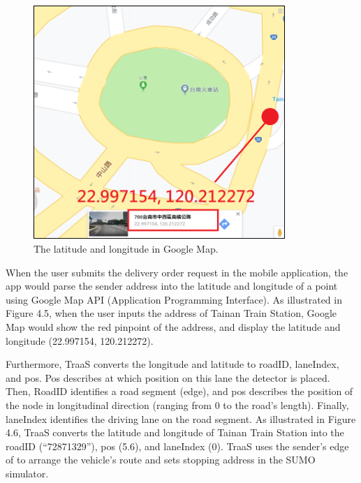 \documentclass[12pt]{ksthesis}
\begin{document}
\begin{thesis}
{\begin{figure}[H]
\centering
\includegraphics[width=0.85\textwidth]{./Thesis_figures/F4-5_GPS_googleMap.PNG}
\caption{\large The latitude and longitude in Google Map.}
\vspace{0.5cm}
\label{Fig:GPS_in_GoggleMap}
\end{figure}


When the user submits the delivery order request in the mobile application, the app would parse the sender address into the latitude and longitude of a point using Google Map API (Application Programming Interface).
As illustrated in Figure 4.5, when the user inputs the address of Tainan Train Station, Google Map would show the red pinpoint of the address, and display the latitude and longitude (22.997154, 120.212272).

Furthermore, TraaS converts the longitude and latitude to roadID, laneIndex, and pos. Pos describes at which position on this lane the detector is placed. Then, RoadID identifies a road segment (edge), and pos describes the position of the node in longitudinal direction (ranging from 0 to the road's length). Finally, laneIndex identifies the driving lane on the road segment.
As illustrated in Figure 4.6, TraaS converts the latitude and longitude of Tainan Train Station into the roadID (“72871329”), pos (5.6), and laneIndex (0).
TraaS uses the sender’s edge of to arrange the vehicle’s route and sets stopping address in the SUMO simulator.

}
\end{thesis}
\end{document}
